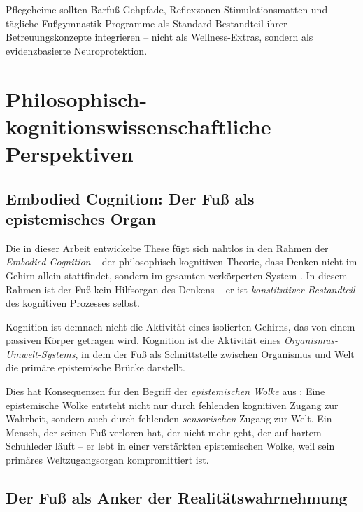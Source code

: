 ﻿\documentclass[12pt,a4paper]{report}
\theoremstyle{plain}
\theoremstyle{definition}
\theoremstyle{remark}
\begin{document}
Pflegeheime sollten Barfuß-Gehpfade, Reflexzonen-Stimulationsmatten
und tägliche Fußg\-ymnastik-Programme als Standard-Bestandteil
ihrer Betreuungskonzepte integrieren -- nicht als Wellness-Extras,
sondern als evidenzbasierte Neuroprotektion.

\section{Philosophisch-kognitionswissenschaftliche Perspektiven}

\subsection{Embodied Cognition: Der Fuß als epistemisches Organ}

Die in dieser Arbeit entwickelte These fügt sich nahtlos in den
Rahmen der \emph{Embodied Cognition} -- der philosophisch-kognitiven
Theorie, dass Denken nicht im Gehirn allein stattfindet, sondern
im gesamten verkörperten System \cite{barsalou2008}. In diesem
Rahmen ist der Fuß kein Hilfsorgan des Denkens -- er ist
\emph{konstitutiver Bestandteil} des kognitiven Prozesses selbst.

Kognition ist demnach nicht die Aktivität eines isolierten
Gehirns, das von einem passiven Körper getragen wird. Kognition
ist die Aktivität eines \emph{Organismus-Umwelt-Systems}, in dem
der Fuß als Schnittstelle zwischen Organismus und Welt die
primäre epistemische Brücke darstellt.

Dies hat Konsequenzen für den Begriff der \emph{epistemischen
Wolke} aus \cite{epp2026brn}: Eine epistemische Wolke entsteht
nicht nur durch fehlenden kognitiven Zugang zur Wahrheit,
sondern auch durch fehlenden \emph{sensorischen} Zugang zur Welt.
Ein Mensch, der seinen Fuß verloren hat, der nicht mehr geht,
der auf hartem Schuhleder läuft -- er lebt in einer verstärkten
epistemischen Wolke, weil sein primäres Weltzugangsorgan
kompromittiert ist.

\subsection{Der Fuß als Anker der Realitätswahrnehmung}
\end{document}
